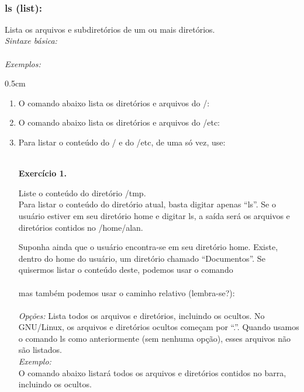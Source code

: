 \begin{refsection}
\\
\subsubsection{ls (list):}\label{tut1:text_mode:commands:ls}
 Lista os arquivos e subdiretórios de um ou mais diretórios.\\
 \textit{Sintaxe básica:}\\
\\
 \textit{Exemplos:}
\begin {myindentpar}{0.5cm}
\begin{enumerate}[\itshape i.]
  \item {O comando abaixo lista os diretórios e arquivos do /:}\\

  \item {O comando abaixo lista os diretórios e arquivos do /etc:}\\

   \item {Para listar o conteúdo do / e do /etc, de uma só vez, use:}\\
\\

\begin{blackBlock}{\textbf{Exercício 1.}}\label{tut1:ex:1.\arabic{ex}}

Liste o conteúdo do diretório /tmp.\\
 Para listar o conteúdo do diretório atual, basta digitar apenas ``ls''. Se o usuário estiver em seu diretório home e digitar ls, a saída será os arquivos e diretórios contidos no /home/alan.\\

\end{blackBlock}

Suponha ainda que o usuário encontra-se em seu diretório home. Existe, dentro do home do usuário, um diretório chamado ``Documentos''. Se quisermos listar o conteúdo deste, podemos usar o comando\\
 \\
 mas também podemos usar o caminho relativo (lembra-se?):\\
\\
 \textit{Opções:}
         Lista todos os arquivos e diretórios, incluindo os ocultos. No GNU/Linux, os arquivos e diretórios ocultos começam por ``.''. Quando usamos o comando ls como anteriormente (sem nenhuma opção), esses arquivos não são listados.\\
 \textit{Exemplo:}\\
 O comando abaixo listará todos os arquivos e diretórios contidos no barra, incluindo os ocultos.\\
 \\


\end{enumerate}
\end{myindentpar}
\end{refsection}
